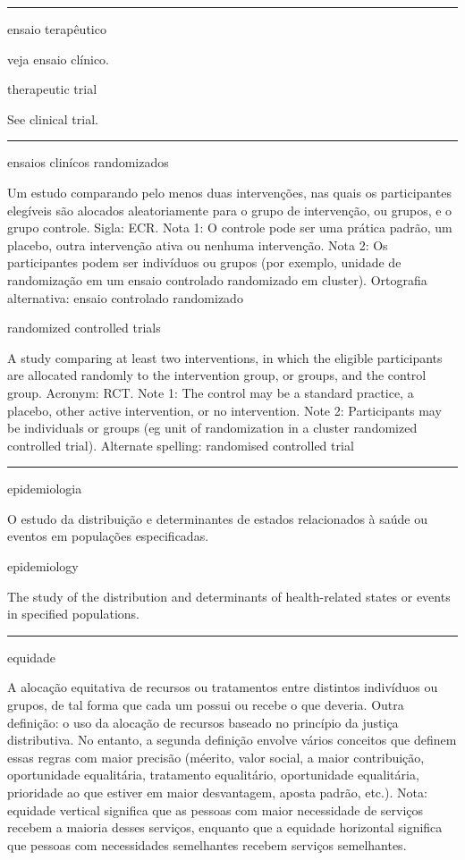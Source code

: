 \documentclass[
  openany]{book}
\begin{document}
\begin{center}\rule{0.5\linewidth}{0.5pt}\end{center}

ensaio terapêutico

veja ensaio clínico.

therapeutic trial

See clinical trial.

\begin{center}\rule{0.5\linewidth}{0.5pt}\end{center}

ensaios clinícos randomizados

Um estudo comparando pelo menos duas intervenções, nas quais os participantes elegíveis são alocados aleatoriamente para o grupo de intervenção, ou grupos, e o grupo controle. Sigla: ECR. Nota 1: O controle pode ser uma prática padrão, um placebo, outra intervenção ativa ou nenhuma intervenção. Nota 2: Os participantes podem ser indivíduos ou grupos (por exemplo, unidade de randomização em um ensaio controlado randomizado em cluster). Ortografia alternativa: ensaio controlado randomizado

randomized controlled trials

A study comparing at least two interventions, in which the eligible participants are allocated randomly to the intervention group, or groups, and the control group. Acronym: RCT. Note 1: The control may be a standard practice, a placebo, other active intervention, or no intervention. Note 2: Participants may be individuals or groups (eg unit of randomization in a cluster randomized controlled trial). Alternate spelling: randomised controlled trial

\begin{center}\rule{0.5\linewidth}{0.5pt}\end{center}

epidemiologia

O estudo da distribuição e determinantes de estados relacionados à saúde ou eventos em populações especificadas.

epidemiology

The study of the distribution and determinants of health-related states or events in specified populations.

\begin{center}\rule{0.5\linewidth}{0.5pt}\end{center}

equidade

A alocação equitativa de recursos ou tratamentos entre distintos indivíduos ou grupos, de tal forma que cada um possui ou recebe o que deveria. Outra definição: o uso da alocação de recursos baseado no princípio da justiça distributiva. No entanto, a segunda definição envolve vários conceitos que definem essas regras com maior precisão (méerito, valor social, a maior contribuição, oportunidade equalitária, tratamento equalitário, oportunidade equalitária, prioridade ao que estiver em maior desvantagem, aposta padrão, etc.). Nota: equidade vertical significa que as pessoas com maior necessidade de serviços recebem a maioria desses serviços, enquanto que a equidade horizontal significa que pessoas com necessidades semelhantes recebem serviços semelhantes.
\end{document}

